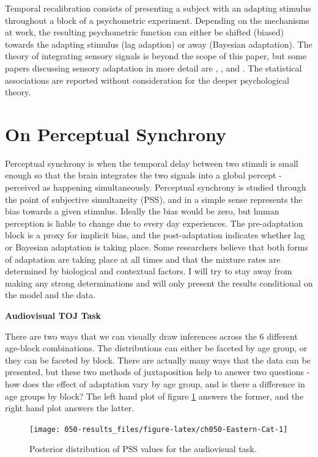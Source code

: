 \documentclass[11pt, oneside, openany]{scrbook}
\begin{document}
Temporal recalibration consists of presenting a subject with an adapting stimulus throughout a block of a psychometric experiment. Depending on the mechanisms at work, the resulting psychometric function can either be shifted (biased) towards the adapting stimulus (lag adaption) or away (Bayesian adaptation). The theory of integrating sensory signals is beyond the scope of this paper, but some papers discussing sensory adaptation in more detail are \citet{miyazaki2006bayesian}, \citet{sato2011bayesian}, and \citet{stocker2005sensory}. The statistical associations are reported without consideration for the deeper psychological theory.

\hypertarget{on-perceptual-synchrony}{%
\section{On Perceptual Synchrony}\label{on-perceptual-synchrony}}

Perceptual synchrony is when the temporal delay between two stimuli is small enough so that the brain integrates the two signals into a global percept - perceived as happening simultaneously. Perceptual synchrony is studied through the point of subjective simultaneity (PSS), and in a simple sense represents the bias towards a given stimulus. Ideally the bias would be zero, but human perception is liable to change due to every day experiences. The pre-adaptation block is a proxy for implicit bias, and the post-adaptation indicates whether lag or Bayesian adaptation is taking place. Some researchers believe that both forms of adaptation are taking place at all times and that the mixture rates are determined by biological and contextual factors. I will try to stay away from making any strong determinations and will only present the results conditional on the model and the data.

\textbf{Audiovisual TOJ Task}

There are two ways that we can visually draw inferences across the 6 different age-block combinations. The distributions can either be faceted by age group, or they can be faceted by block. There are actually many ways that the data can be presented, but these two methods of juxtaposition help to answer two questions - how does the effect of adaptation vary by age group, and is there a difference in age groups by block? The left hand plot of figure \ref{fig:ch050-Eastern-Cat} answers the former, and the right hand plot answers the latter.

\begin{figure}

{\centering \texttt{[image: 050-results\_files/figure-latex/ch050-Eastern-Cat-1]} 

}

\caption{Posterior distribution of PSS values for the audiovisual task.}\label{fig:ch050-Eastern-Cat}
\end{figure}
\end{document}
